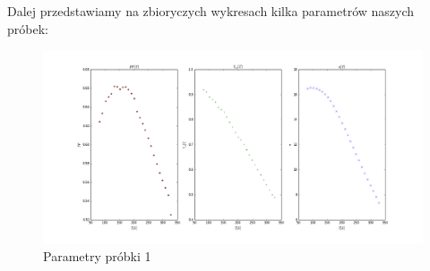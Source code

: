 \documentclass[a4paper,12pt]{article}
\begin{document}
Dalej przedstawiamy na zbioryczych wykresach kilka parametrów naszych próbek:

\begin{figure} [H]
  \begin{center}
    \includegraphics[width = 15cm]{probka1_rozne.png}
    \caption{Parametry próbki 1}
  \end{center}
\end{figure}
\end{document}
